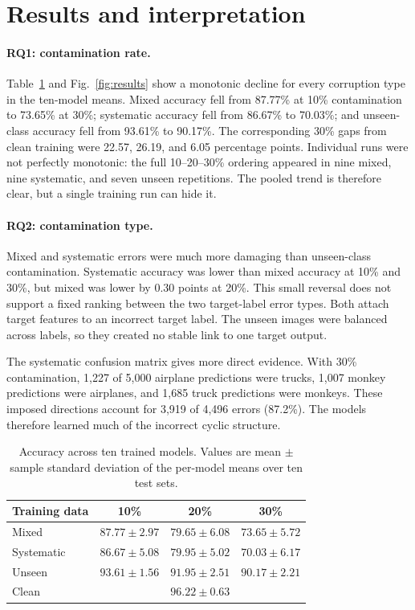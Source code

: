 \section{Results and interpretation}
\label{sec:results}

\paragraph{RQ1: contamination rate.}
Table~\ref{tab:accuracy} and Fig.~\ref{fig:results} show a monotonic decline for
every corruption type in the ten-model means. Mixed accuracy fell from 87.77\%
at 10\% contamination to 73.65\% at 30\%; systematic accuracy fell from
86.67\% to 70.03\%; and unseen-class accuracy fell from 93.61\% to 90.17\%.
The corresponding 30\% gaps from clean training were 22.57, 26.19, and 6.05
percentage points. Individual runs were not perfectly monotonic: the full
10--20--30\% ordering appeared in nine mixed, nine systematic, and seven unseen
repetitions. The pooled trend is therefore clear, but a single training run can
hide it.

\paragraph{RQ2: contamination type.}
Mixed and systematic errors were much more damaging than unseen-class
contamination. Systematic accuracy was lower than mixed accuracy at 10\% and
30\%, but mixed was lower by 0.30 points at 20\%. This small reversal does not
support a fixed ranking between the two target-label error types. Both attach
target features to an incorrect target label. The unseen images were balanced
across labels, so they created no stable link to one target output.

The systematic confusion matrix gives more direct evidence. With 30\%
contamination, 1,227 of 5,000 airplane predictions were trucks, 1,007 monkey
predictions were airplanes, and 1,685 truck predictions were monkeys. These
imposed directions account for 3,919 of 4,496 errors (87.2\%). The models
therefore learned much of the incorrect cyclic structure.

\begin{table}[b]
  \centering
  \caption{Accuracy across ten trained models. Values are
  mean $\pm$ sample standard deviation of the per-model means over ten test
  sets.}
  \label{tab:accuracy}
  \small
  \setlength{\tabcolsep}{4pt}
  \begin{tabular}{lccc}
    \toprule
    Training data & 10\% & 20\% & 30\% \\
    \midrule
    Mixed       & $87.77\pm2.97$ & $79.65\pm6.08$ & $73.65\pm5.72$ \\
    Systematic  & $86.67\pm5.08$ & $79.95\pm5.02$ & $70.03\pm6.17$ \\
    Unseen      & $93.61\pm1.56$ & $91.95\pm2.51$ & $90.17\pm2.21$ \\
    \midrule
    Clean       & \multicolumn{3}{c}{$96.22\pm0.63$} \\
    \bottomrule
  \end{tabular}
\end{table}

